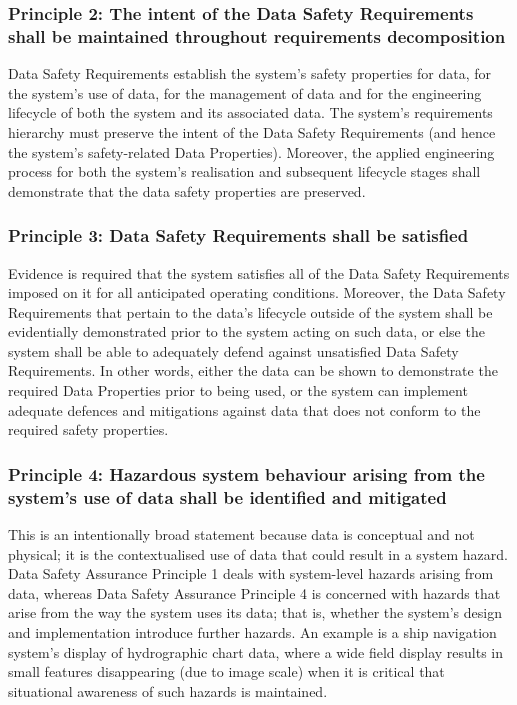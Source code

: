 \subsubsection{Principle 2: The intent of the Data Safety Requirements shall be maintained throughout requirements decomposition}
Data Safety Requirements establish the system's safety properties for data, for the system's use of data, for the management of data and for the engineering lifecycle of both the system and its associated data. The system's requirements hierarchy must preserve the intent of the Data Safety Requirements (and hence the system's safety-related Data Properties). Moreover, the applied engineering process for both the system's realisation and subsequent lifecycle stages shall demonstrate that the data safety properties are preserved.

\subsubsection{Principle 3: Data Safety Requirements shall be satisfied}
Evidence is required that the system satisfies all of the Data Safety Requirements imposed on it for all anticipated operating conditions. Moreover, the Data Safety Requirements that pertain to the data's lifecycle outside of the system shall be evidentially demonstrated prior to the system acting on such data, or else the system shall be able to adequately defend against \cbstart unsatisfied \cbend{}Data Safety Requirements. In other words, either the data can be shown to demonstrate the required Data Properties prior to being used, or the system can implement adequate defences and mitigations against data that does not conform to the required safety properties.

\subsubsection{Principle 4: Hazardous system behaviour arising from the system's use of data shall be identified and mitigated}
This is an intentionally broad statement because data is conceptual and not physical; it is the contextualised use of data that could result in a system hazard. Data Safety Assurance Principle 1 deals with system-level hazards arising from data, whereas Data Safety Assurance Principle 4 is concerned with hazards that arise from the way the system uses its data; that is, whether the system's design and implementation introduce further hazards. An example is a ship navigation system's display of hydrographic chart data, where a wide field display results in \cbstart small features \cbend disappearing (due to image scale) when it is critical that situational awareness of such hazards is maintained.


